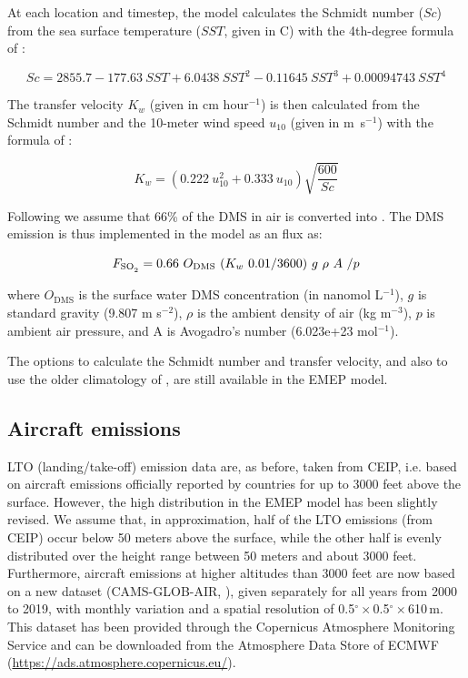 At each location and timestep, the model calculates the Schmidt number ($Sc$) from the sea surface temperature ($SST$, given in \textdegree C) with the 4th-degree formula of \citet{Wanninkhof2014}:


\begin{equation}
Sc=2855.7 -177.63\  SST + 6.0438\  SST^2 - 0.11645\  SST^3 + 0.00094743\ SST^4
\end{equation}


The transfer velocity $K_{w}$ (given in cm hour$^{-1}$) is then calculated  from the Schmidt number and the 10-meter wind speed $u_{10}$ (given in m~s$^{-1}$) with the formula of \citet{Nightingale2000}:

\begin{equation}
K_w=(0.222\  u_{10}^2 +0.333\ u_{10}) \sqrt{\frac{600}{Sc}}
\end{equation}

Following \citet{Leonor:DMS2} we assume that 66\% of the DMS in air is converted into . The DMS emission is thus implemented in the model as an  flux as:

\begin{equation}
F_{\ce{SO2}} = 0.66\ O_{\textrm{DMS}}\ (K_{w}\ 0.01/3600)\ g\ \rho\ A\ / p  
\end{equation}

where $O_{\textrm{DMS}}$ is the surface water DMS concentration (in nanomol L$^{-1}$),
$g$ is standard gravity (9.807 m s$^{-2}$),
$\rho$ is the ambient density of air (kg m$^{-3}$),
$p$ is ambient air pressure,
and A is Avogadro's number (6.023e+23 mol$^{-1}$).

The options to calculate the Schmidt number and transfer velocity, and also to use the older climatology of \citet{Kettle1999}, are still available in the EMEP model.

\subsection{Aircraft emissions}
\label{ssec:Aircraft}

 LTO (landing/take-off) emission data are, as before, taken from CEIP, i.e. based on aircraft emissions officially reported by countries for up to 3000 feet above the surface. However, the high distribution in the EMEP model has been slightly revised. We assume that, in approximation, half of the LTO emissions (from CEIP) occur below 50 meters above the surface, while the other half is evenly distributed over the height range between 50 meters and about 3000 feet.
 Furthermore, aircraft emissions at higher altitudes than 3000 feet are now based on a new dataset (CAMS-GLOB-AIR, \citealt{GranierCAMS2019}), given separately for all years from 2000 to 2019, with monthly variation and a spatial resolution of 0.5$^\circ$\,$\times$\,0.5$^\circ$\,$\times$\,610\,m. This dataset has been provided through the Copernicus Atmosphere Monitoring Service and can be downloaded from the Atmosphere Data Store of ECMWF (\url{https://ads.atmosphere.copernicus.eu/}).

